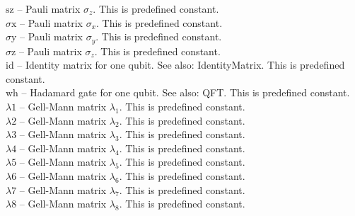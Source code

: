 \noindent\textbf{$ \text{sz} $ }-- Pauli matrix $ \sigma _z $. This is predefined constant.$  $\\

\noindent\textbf{$ \text{$\sigma $x} $ }-- Pauli matrix $ \sigma _x $. This is predefined constant.$  $\\

\noindent\textbf{$ \text{$\sigma $y} $ }-- Pauli matrix $ \sigma _y $. This is predefined constant.$  $\\

\noindent\textbf{$ \text{$\sigma $z} $ }-- Pauli matrix $ \sigma _z $. This is predefined constant.$  $\\

\noindent\textbf{$ \text{id} $ }-- Identity matrix for one qubit. See also: IdentityMatrix. This is predefined constant.$  $\\

\noindent\textbf{$ \text{wh} $ }-- Hadamard gate for one qubit. See also: QFT. This is predefined constant.$  $\\

\noindent\textbf{$ \text{$\lambda $1} $ }-- Gell-Mann matrix $ \lambda _1 $. This is predefined constant.$  $\\

\noindent\textbf{$ \text{$\lambda $2} $ }-- Gell-Mann matrix $ \lambda _2 $. This is predefined constant.$  $\\

\noindent\textbf{$ \text{$\lambda $3} $ }-- Gell-Mann matrix $ \lambda _3 $. This is predefined constant.$  $\\

\noindent\textbf{$ \text{$\lambda $4} $ }-- Gell-Mann matrix $ \lambda _4 $. This is predefined constant.$  $\\

\noindent\textbf{$ \text{$\lambda $5} $ }-- Gell-Mann matrix $ \lambda _5 $. This is predefined constant.$  $\\

\noindent\textbf{$ \text{$\lambda $6} $ }-- Gell-Mann matrix $ \lambda _6 $. This is predefined constant.$  $\\

\noindent\textbf{$ \text{$\lambda $7} $ }-- Gell-Mann matrix $ \lambda _7 $. This is predefined constant.$  $\\

\noindent\textbf{$ \text{$\lambda $8} $ }-- Gell-Mann matrix $ \lambda _8 $. This is predefined constant.$  $\\

